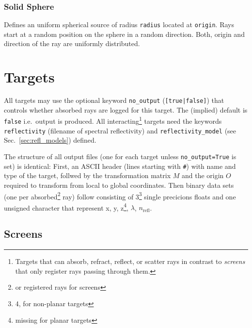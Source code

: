 \documentclass[10pt,a4paper,titlepage]{article}
\begin{document}
\subsubsection{Solid Sphere}








\vspace{0.25cm}
Defines an uniform spherical source of radius {\tt radius} located at {\tt origin}. Rays start at a random position on the sphere in a random direction. Both, origin and direction of the ray are uniformly distributed.




\section{Targets}
All targets may use the optional keyword {\tt no\_output} ({\tt [true|false]}) that controls whether absorbed rays are logged for this target. The (implied) default is {\tt false} i.e.\ output is produced. All interacting\footnote{Targets that can absorb, refract, reflect, or scatter rays in contrast to {\it screens} that only register rays passing through them.} targets need the keywords {\tt reflectivity} (filename of spectral reflectivity) and {\tt reflectivity\_model} (see Sec.~\ref{sec:refl_models}) defined.

The structure of all output files (one for each target unless {\tt no\_output=True} is set) is identical: First, an ASCII header (lines starting with {\tt \#}) with name and type of the target, follwed by the transformation matrix $M$ and the origin $O$ required to transform from local to global coordinates. Then binary data sets (one per absorbed\footnote{or registered rays for screens} ray) follow consisting of 3\footnote{4, for non-planar targets} single precicions floats and one unsigned character that represent x, y, z\footnote{missing for planar targets}, $\lambda$, $n_{\mathrm{refl}}$.


\subsection{Screens}
\end{document}
